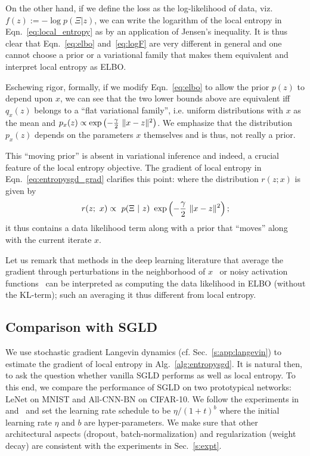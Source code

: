 \documentclass[10pt]{article}
\newcommand{\lenet}{\textrm{LeNet}}
\newcommand{\allcnn}{\textrm{All-CNN-BN}}
\begin{document}
\begin{appendices}
On the other hand, if we define the loss as the log-likelihood of data, viz. $f(z) := -\log p(\Xi | z)$, we can write the logarithm of the local entropy in Eqn.~\eqref{eq:local_entropy} as
by an application of Jensen's inequality. It is thus clear that Eqn.~\eqref{eq:elbo} and~\eqref{eq:logF} are very different in general and one cannot choose a prior or a variational family that makes them equivalent and interpret local entropy as ELBO.

Eschewing rigor, formally, if we modify Eqn.~\eqref{eq:elbo} to allow the prior $p(z)$ to depend upon $x$, we can see that the two lower bounds above are equivalent iff $q_x(z)$ belongs to a ``flat variational family'', i.e. uniform distributions with $x$ as the mean and $p_x(z) \propto \exp \left(-\frac{\gamma}{2}\ \lVert x-z\rVert^2\right)$. We emphasize that the distribution $p_x(z)$ depends on the parameters $x$ themselves and is thus, not really a prior.

This ``moving prior'' is absent in variational inference and indeed, a crucial feature of the local entropy objective. The gradient of local entropy in Eqn.~\eqref{eq:entropysgd_grad} clarifies this point:
where the distribution $r(z; x)$ is given by
$$
    r(z;\ x) \propto\ p(\Xi\ |\ z)\ \exp \rbrac{-\f{\g}{2}\ \norm{x-z}^2};
$$
it thus contains a data likelihood term along with a prior that ``moves'' along with the current iterate $x$.

Let us remark that methods in the deep learning literature that average the gradient through perturbations in the neighborhood of $x$~\citep{mobahi2016training} or noisy activation functions~\citep{gulcehre2016mollifying} can be interpreted as computing the data likelihood in ELBO (without the KL-term); such an averaging it thus different from local entropy.

\subsection{Comparison with SGLD}
\label{ss:app:comparison_sgld}

We use stochastic gradient Langevin dynamics (cf. Sec.~\ref{s:app:langevin}) to estimate the gradient of local entropy in Alg.~\ref{alg:entropysgd}. It is natural then, to ask the question whether vanilla SGLD performs as well as local entropy.
%
To this end, we compare the performance of SGLD on two prototypical networks: $\lenet$ on MNIST and $\allcnn$ on CIFAR-10. We follow the experiments in~\citep{welling2011bayesian} and~\citep{chen2015bridging} and set the learning rate schedule to be $\eta/(1 + t)^b$ where the initial learning rate $\eta$ and $b$ are hyper-parameters. We make sure that other architectural aspects (dropout, batch-normalization) and regularization (weight decay) are consistent with the experiments in Sec.~\ref{s:expt}.


\end{appendices}
\end{document}
